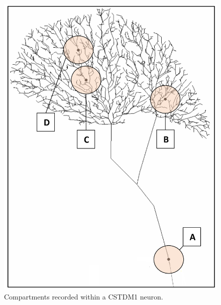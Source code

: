 \documentclass[a4paper,11pt]{article}
\begin{document}
\begin{figure}[H]
\centering
\includegraphics[scale=0.5]{cstmd_neuron}
\caption{Compartments recorded within a CSTDM1 neuron.}
\end{figure}
\end{document}
